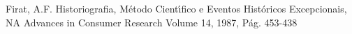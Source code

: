 \documentclass[
12pt,		%
openright,	%
twoside,  %
a4paper,			%
chapter=TITLE,		%
english,			%
french,				%
spanish,			%
brazil				%
]{USPSC-classe/USPSC}
\begin{document}
\begin{flushleft}
\begin{flushleft}
\begin{flushleft}
\begin{flushleft}
\begin{flushleft}
\begin{flushleft}
\begin{flushleft}
\begin{flushleft}
\begin{flushleft}
\begin{flushleft}
[Firat, 1987] Firat, A.F. Historiografia, M\'etodo Cient\'{\i}fico e Eventos Hist\'oricos Excepcionais, NA Advances in Consumer Research Volume 14, 1987, P\'ag. 453-438
\end{flushleft}


\end{flushleft}


\end{flushleft}


\end{flushleft}


\end{flushleft}


\end{flushleft}


\end{flushleft}


\end{flushleft}


\end{flushleft}


\end{flushleft}
\end{document}
